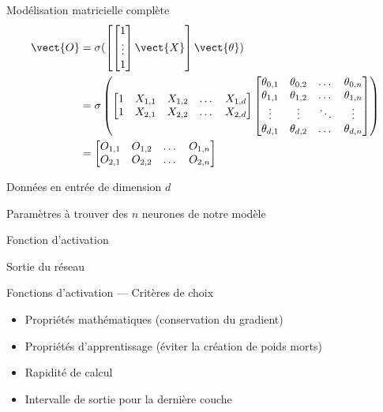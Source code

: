 \begin{frame}{Modélisation matricielle complète}
  \footnotesize
  \begin{align*}
    \vect{O} & = \sigma (\begin{bmatrix}\begin{bmatrix}1 \\ \vdots \\ 1\end{bmatrix}\vect{X}\end{bmatrix}\vect{\theta}) \\
    & = \sigma \left(
    \begin{bmatrix}
      1 & X_{1,1} & X_{1,2} & \dots & X_{1,d} \\
      1 & X_{2,1} & X_{2,2} & \dots & X_{2,d}
    \end{bmatrix}
    \begin{bmatrix}
      \theta_{0,1} & \theta_{0,2} & \dots  & \theta_{0,n} \\
      \theta_{1,1} & \theta_{1,2} & \dots  & \theta_{1,n} \\
      \vdots & \vdots & \ddots & \vdots \\
      \theta_{d,1} & \theta_{d,2} & \dots  & \theta_{d,n}
    \end{bmatrix}
    \right) \\
    & = \begin{bmatrix}
      O_{1,1} & O_{1,2} & \dots & O_{1,n} \\
      O_{2,1} & O_{2,2} & \dots & O_{2,n}
    \end{bmatrix}
  \end{align*}
  \begin{description}[<+->]
    \item[$\vect{X}$] Données en entrée de dimension $d$
    \item[$\vect{\theta}$] Paramètres à trouver des $n$ neurones de notre modèle
    \item[$\vect{\sigma}$] Fonction d'activation
    \item[$\vect{O}$] Sortie du réseau
  \end{description}
\end{frame}

\begin{frame}{Fonctions d'activation --- Critères de choix}
  \begin{itemize}[<+->]
    \item Propriétés mathématiques (conservation du gradient)
    \item Propriétés d'apprentissage (éviter la création de poids morts)
    \item Rapidité de calcul
    \item Intervalle de sortie pour la dernière couche
  \end{itemize}
\end{frame}

